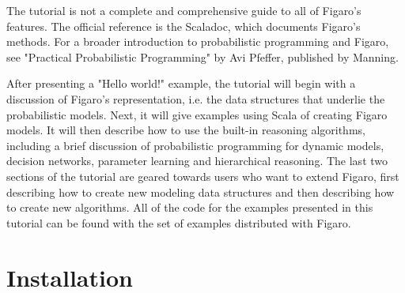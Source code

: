 The tutorial is not a complete and comprehensive guide to all of Figaro's features. The official reference is the Scaladoc, which documents Figaro's methods. For a broader introduction to probabilistic programming and Figaro, see "Practical Probabilistic Programming" by Avi Pfeffer, published by Manning.

After presenting a "Hello world!" example, the tutorial will begin with a discussion of Figaro's representation, i.e. the data structures that underlie the probabilistic models. Next, it will give examples
using Scala of creating Figaro models. It will then describe how to use the built-in reasoning algorithms, including a brief discussion of probabilistic programming for dynamic models, decision networks,
parameter learning and hierarchical reasoning. The last two sections of the tutorial are geared towards users who want to extend Figaro, first describing how to create new modeling data structures and then describing how to create new algorithms. All of the code for the examples presented in this tutorial can be
found with the set of examples distributed with Figaro.

\section{Installation}


